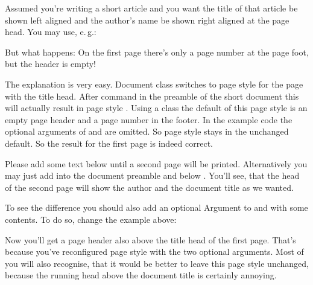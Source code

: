 \begin{Example}
  Assumed you're writing a short article and you want the title of that
  article be shown left aligned and the author's name be
  shown right aligned at the page head. You may use, e.\,g.:
  But what happens: On the first page there's only a page number at the page
  foot, but the header is empty!

  The explanation is very easy. Document class  switches to
  page style  for the page with the title head. After command
   in the preamble of the short
  document this will actually result in page style
  . Using a \KOMAScript{} class the default of
  this page style is an empty page header and a page number in the footer. In
  the example code the optional arguments of  and 
  are omitted. So page style  stays in the
  unchanged default. So the result for the first page is indeed correct.

  Please add some text below  until a second page will be
  printed. Alternatively you may just add
   into the document
  preamble and  below . You'll
  see, that the head of the second page will show the author and the document
  title as we wanted.

  To see the difference you should also add an optional Argument to
   and  with some contents. To do so, change the
  example above:
  Now you'll get a page header also above the title head of the first
  page. That's because you've reconfigured page style
   with the two optional arguments. Most of you
  will also recognise, that it would be better to leave this page style
  unchanged, because the running head above the document title is certainly
  annoying.
\end{Example}

